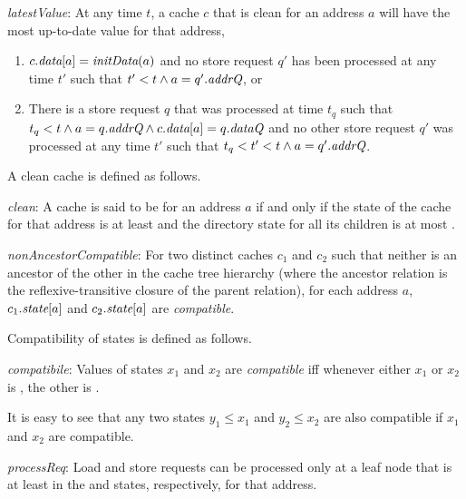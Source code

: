 \begin{inv}
\textit{latestValue}:
At any time $t$, a cache $c$ that is clean for an address $a$ will have the most
up-to-date value for that address, \ie{}
\begin{enumerate}
\item $c.\textit{data}[a] = \textit{initData}(a)$ and no store request $q'$ has been processed at
any time $t'$ such that $t' < t \wedge a = q'.\textit{addrQ}$, or
\item There is a store request $q$ that was processed at time $t_q$ such that
$t_q < t \wedge a = q.\textit{addrQ} \wedge c.\textit{data}[a] = q.\textit{dataQ}$ and no other store
request $q'$ was processed at any time $t'$ such that $t_q < t' < t \wedge a =
q'.\textit{addrQ}$.
\end{enumerate}
\label{latestValue}
\end{inv}

\vspace{-.15in}

A clean cache is defined as follows.
\begin{defn}
\textit{clean}: A cache is said to be \clean{} for an address $a$ if and only if
the state of the cache for that address is at least \Sh{} and the directory 
state for all its children is at most \Sh.
\label{clean}
\end{defn}

\begin{inv}
\textit{nonAncestorCompatible}: For two distinct caches $c_1$ and $c_2$ such
that neither is an ancestor of the other in the cache tree hierarchy (where
the ancestor relation is the reflexive-transitive closure of the parent relation),
for each address $a$, $c_1.\textit{state}[a]$ and $c_2.\textit{state}[a]$ are
\textit{compatible}.
\label{nonAncestorCompatible}
\end{inv}
Compatibility of states is defined as follows.
\begin{defn}
\textit{compatibile}: Values of states $x_1$ and $x_2$ are \textit{compatible}
iff whenever either $x_1$ or $x_2$ is \Mo{}, the other is \In.
\label{compatible}
\end{defn}

It is easy to see that any two states $y_1 \le x_1$ and $y_2 \le x_2$ are also
compatible if $x_1$ and $x_2$ are compatible.

\begin{inv}
\textit{processReq}: Load and store requests can be processed only at a leaf
node that is at least in the \Sh{} and \Mo{} states, respectively, for that
address.
\label{processReq}
\end{inv}

